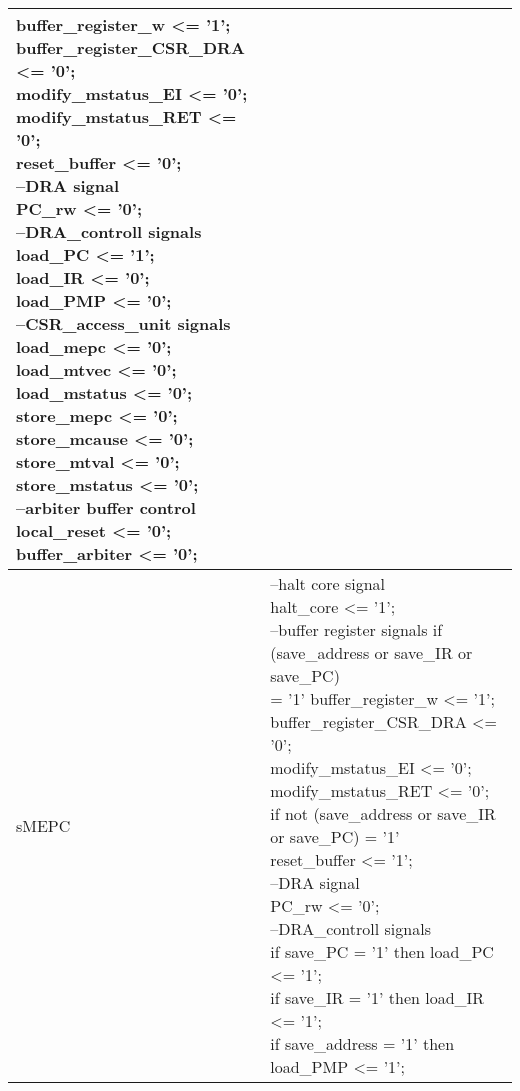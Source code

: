 \begin{small}
\begin{longtable}{| p{} | p{} |}
{			buffer\_register\_w <= '1';\\
			buffer\_register\_CSR\_DRA <= '0';\\
			modify\_mstatus\_EI <= '0';\\
			modify\_mstatus\_RET <= '0';\\
			reset\_buffer <= '0';\\
			--DRA signal\\
			PC\_rw <= '0';\\
			--DRA\_controll signals\\
			load\_PC <= '1';\\
			load\_IR <= '0';\\
			load\_PMP <= '0';\\
			--CSR\_access\_unit signals\\
			load\_mepc <= '0';\\
			load\_mtvec <= '0';\\
			load\_mstatus <= '0';\\
			store\_mepc <= '0';\\
			store\_mcause <= '0';\\
			store\_mtval <= '0';\\
			store\_mstatus <= '0';\\
			--arbiter buffer control\\
			local\_reset <= '0';\\
			buffer\_arbiter <= '0';} \\
		\hline
		sMEPC & \makecell{--halt core signal\\
		halt\_core <= '1';\\
		--buffer register signals
		if (save\_address or save\_IR or save\_PC)\\ = '1' buffer\_register\_w <= '1';\\
		buffer\_register\_CSR\_DRA <= '0';\\
		modify\_mstatus\_EI <= '0';\\
		modify\_mstatus\_RET <= '0';\\
		if not (save\_address or save\_IR or save\_PC) = '1'\\ reset\_buffer <= '1';\\
		--DRA signal\\
		PC\_rw <= '0';\\
		--DRA\_controll signals\\
		if save\_PC = '1' then load\_PC <= '1';\\
		if save\_IR = '1' then load\_IR <= '1';\\
		if save\_address = '1' then load\_PMP <= '1';\\
}
\end{longtable}
\end{small}
